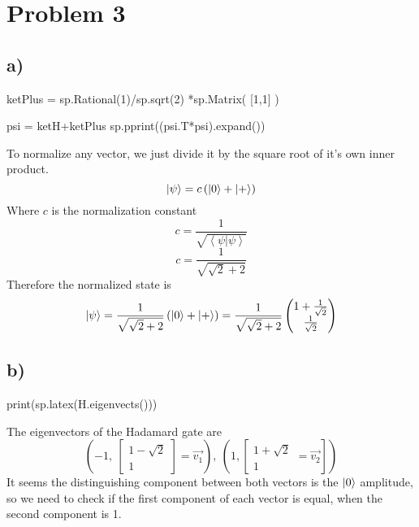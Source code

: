 \documentclass[]{article}
\newenvironment{Shaded}{\begin{snugshade}}{\end{snugshade}}
\newcommand{\NormalTok}[1]{#1}
\begin{document}
\hypertarget{problem-3}{%
\section{Problem 3}\label{problem-3}}

\hypertarget{a-2}{%
\subsection{a)}\label{a-2}}

\begin{Shaded}
\begin{Highlighting}[]
\NormalTok{ketPlus = sp.Rational(1)/sp.sqrt(2) *sp.Matrix(}
\NormalTok{[1,1]}
\NormalTok{)}


\NormalTok{psi = ketH+ketPlus}
\NormalTok{sp.pprint((psi.T*psi).expand())}
\end{Highlighting}
\end{Shaded}

To normalize any vector, we just divide it by the square root of it's
own inner product. \[
\ket{\psi}  = c\left( \ket{0} +\ket{+}  \right) 
\] Where \(c\) is the normalization constant \[
c = \frac{1}{\sqrt{ \left<\psi|\psi\right>  }}
\] \[
c = \frac{1}{\sqrt{ \sqrt{ 2 }+2 }}
\] Therefore the normalized state is \[
\ket{\psi}  = \frac{1}{\sqrt{ \sqrt{ 2 }+2 }}\left( \ket{0} +\ket{+}  \right) =\frac{1}{\sqrt{ \sqrt{ 2 }+2 }}\begin{pmatrix}
1+\frac{1}{\sqrt{ 2 }}\\
\frac{1}{\sqrt{ 2 }}
\end{pmatrix}
\]

\hypertarget{b-2}{%
\subsection{b)}\label{b-2}}

\begin{Shaded}
\begin{Highlighting}[]
\NormalTok{print(sp.latex(H.eigenvects()))}
\end{Highlighting}
\end{Shaded}

The eigenvectors of the Hadamard gate are \[
 \left( -1,\  \left[\begin{matrix}1 - \sqrt{2}\\1\end{matrix}\right]=\vec{v_{1}}\right), \ \left( 1, \left[\begin{matrix}1 + \sqrt{2}\\1\end{matrix}=\vec{v_{2}}\right]\right)
\] It seems the distinguishing component between both vectors is the
\(\ket{0}\) amplitude, so we need to check if the first component of
each vector is equal, when the second component is 1.
\end{document}
